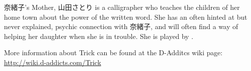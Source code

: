 \par 奈緒子's Mother, 山田さとり is a calligrapher who teaches the children of her home town about the power of the written word. She has an often hinted at but never explained, psychic connection with 奈緒子, and will often find a way of helping her daughter when she is in trouble. She is played by .

\par More information about Trick can be found at the D-Additcs wiki page: \url{http://wiki.d-addicts.com/Trick}

\theendnotes